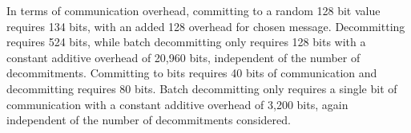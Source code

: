 In terms of communication overhead, committing to a random 128 bit value requires 134 bits, with an added 128 overhead for chosen message. Decommitting requires 524 bits, while batch decommitting only requires 128 bits with a constant additive overhead of 20,960 bits, independent of the number of decommitments. Committing to bits requires 40 bits of communication and decommitting requires 80 bits. Batch decommitting only requires a single bit of communication with a constant additive overhead of 3,200 bits, again independent of the number of decommitments considered.

